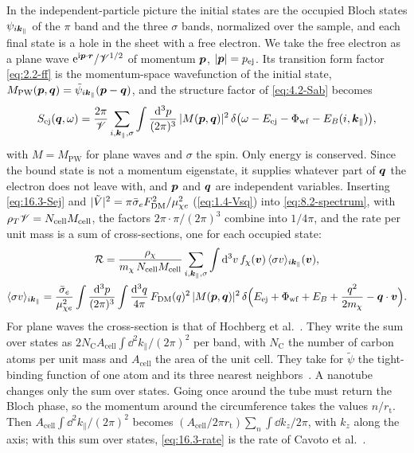 In the independent-particle picture the initial states are the occupied Bloch states $\psi_{i\bm{k}_\parallel}$ of the $\pi$ band and the three $\sigma$ bands, normalized over the sample, and each final state is a hole in the sheet with a free electron. We take the free electron as a plane wave $\mathrm{e}^{\mathrm{i}\bm{p}\cdot\bm{r}}/\mathscr{V}^{1/2}$ of momentum $\bm{p}$, $|\bm{p}| = p_{\mathrm{ej}}$. Its transition form factor \cref{eq:2.2-ff} is the momentum-space wavefunction of the initial state, $M_{\mathrm{PW}}(\bm{p},\bm{q}) = \tilde\psi_{i\bm{k}_\parallel}(\bm{p} - \bm{q})$, and the structure factor of \cref{eq:4.2-Sab} becomes
\begin{equation}
  S_{\mathrm{ej}}(\bm{q},\omega) = \frac{2\pi}{\mathscr{V}}\sum_{i,\bm{k}_\parallel,\sigma}\int\frac{\mathrm{d}^3p}{(2\pi)^3}\,|M(\bm{p},\bm{q})|^2\,\delta\bigl(\omega - E_{\mathrm{ej}} - \Phi_{\mathrm{wf}} - E_B(i,\bm{k}_\parallel)\bigr) ,
  \label{eq:16.3-Sej}
\end{equation}
with $M = M_{\mathrm{PW}}$ for plane waves and $\sigma$ the spin. Only energy is conserved. Since the bound state is not a momentum eigenstate, it supplies whatever part of $\bm{q}$ the electron does not leave with, and $\bm{p}$ and $\bm{q}$ are independent variables. Inserting \cref{eq:16.3-Sej} and $|\tilde V|^2 = \pi\bar{\sigma}_{e}F_{\mathrm{DM}}^2/\mu_{\chi e}^2$ (\cref{eq:1.4-Vsq}) into \cref{eq:8.2-spectrum}, with $\rho_T\mathscr{V} = N_{\mathrm{cell}}M_{\mathrm{cell}}$, the factors $2\pi\cdot\pi/(2\pi)^3$ combine into $1/4\pi$, and the rate per unit mass is a sum of cross-sections, one for each occupied state:
\begin{equation}
  \begin{gathered}
  \mathcal{R} = \frac{\rho_\chi}{m_{\chi}\,N_{\mathrm{cell}}M_{\mathrm{cell}}}\sum_{i,\bm{k}_\parallel,\sigma}\int\mathrm{d}^3v\,f_\chi(\bm{v})\,\langle\sigma v\rangle_{i\bm{k}_\parallel}(\bm{v}) ,\\
  \langle\sigma v\rangle_{i\bm{k}_\parallel} = \frac{\bar{\sigma}_{e}}{\mu_{\chi e}^2}\int\frac{\mathrm{d}^3p}{(2\pi)^3}\int\frac{\mathrm{d}^3q}{4\pi}\,F_{\mathrm{DM}}(q)^2\,|M(\bm{p},\bm{q})|^2\,\delta\Bigl(E_{\mathrm{ej}} + \Phi_{\mathrm{wf}} + E_B + \frac{q^2}{2m_{\chi}} - \bm{q}\cdot\bm{v}\Bigr) .
  \end{gathered}
  \label{eq:16.3-rate}
\end{equation}
For plane waves the cross-section is that of Hochberg et al.~\cite[Eq.~(5)]{hochberg2017directional}. They write the sum over states as $2N_{\mathrm{C}}A_{\mathrm{cell}}\int\dd^2k_\parallel/(2\pi)^2$ per band, with $N_{\mathrm{C}}$ the number of carbon atoms per unit mass and $A_{\mathrm{cell}}$ the area of the unit cell. They take for $\tilde\psi$ the tight-binding function of one atom and its three nearest neighbors~\cite[Eqs.~(1), (3), (7)]{hochberg2017directional}. A nanotube changes only the sum over states. Going once around the tube must return the Bloch phase, so the momentum around the circumference takes the values $n/r_{\mathrm{t}}$. Then $A_{\mathrm{cell}}\int\dd^2k_\parallel/(2\pi)^2$ becomes $(A_{\mathrm{cell}}/2\pi r_{\mathrm{t}})\sum_n\int\dd k_z/2\pi$, with $k_z$ along the axis; with this sum over states, \cref{eq:16.3-rate} is the rate of Cavoto et al.~\cite[Eqs.~(16)--(18), (23)]{cavoto2018sub}.

